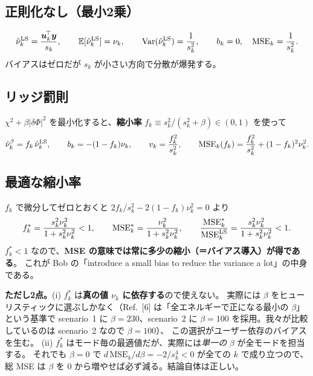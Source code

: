 \documentclass[11pt,a4paper]{ltjsarticle}
\newcommand{\dP}{\delta\Phi}
\newcommand{\E}{\mathbb{E}}
\newcommand{\Var}{\mathrm{Var}}
\begin{document}
\subsection{正則化なし（最小2乗）}
\begin{equation}
\hat\nu_k^{\rm LS}=\frac{\bm u_k^{\!\top}\bm y}{s_k},\qquad
\E[\hat\nu_k^{\rm LS}]=\nu_k,\qquad
\Var(\hat\nu_k^{\rm LS})=\frac{1}{s_k^2},\qquad
b_k=0,\quad \mathrm{MSE}_k=\frac{1}{s_k^{2}} .
\end{equation}
バイアスはゼロだが $s_k$ が小さい方向で分散が爆発する。

\subsection{リッジ罰則}
$\chi^2+\beta|\dP|^2$ を最小化すると、\textbf{縮小率} $f_k\equiv s_k^2/(s_k^2+\beta)\in(0,1)$ を使って
\begin{equation}
\hat\nu_k^{\beta}=f_k\,\hat\nu_k^{\rm LS},\qquad
b_k=-(1-f_k)\nu_k,\qquad
v_k=\frac{f_k^2}{s_k^2},\qquad
\mathrm{MSE}_k(f_k)=\frac{f_k^{2}}{s_k^{2}}+(1-f_k)^{2}\nu_k^{2}.
\end{equation}

\subsection{最適な縮小率}
$f_k$ で微分してゼロとおくと $2f_k/s_k^2-2(1-f_k)\nu_k^2=0$ より
\begin{equation}
f_k^{*}=\frac{s_k^{2}\nu_k^{2}}{1+s_k^{2}\nu_k^{2}}<1,\qquad
\mathrm{MSE}_k^{*}=\frac{\nu_k^{2}}{1+s_k^{2}\nu_k^{2}},\qquad
\frac{\mathrm{MSE}_k^{*}}{\mathrm{MSE}_k^{\rm LS}}=\frac{s_k^2\nu_k^2}{1+s_k^2\nu_k^2}<1 .
\end{equation}
$f_k^*<1$ なので、\textbf{MSE の意味では常に多少の縮小（＝バイアス導入）が得である}。
これが Bob の「introduce a small bias to reduce the variance a lot」の中身である。

\textbf{ただし2点。}(i) $f_k^*$ は\textbf{真の値 $\nu_k$ に依存する}ので使えない。
実際には $\beta$ をヒューリスティックに選ぶしかなく（Ref.~[6] は「全エネルギーで正になる最小の $\beta$」という基準で
scenario~1 に $\beta=230$、scenario~2 に $\beta=100$ を採用。我々が比較しているのは scenario~2 なので $\beta=100$）、
この選択がユーザー依存のバイアスを生む。
(ii) $f_k^*$ はモード毎の最適値だが、実際には\emph{単一の} $\beta$ が全モードを担当する。
それでも $\beta=0$ で $d\,\mathrm{MSE}_k/d\beta=-2/s_k^4<0$ が全ての $k$ で成り立つので、
総 MSE は $\beta$ を 0 から増やせば必ず減る。結論自体は正しい。
\end{document}
